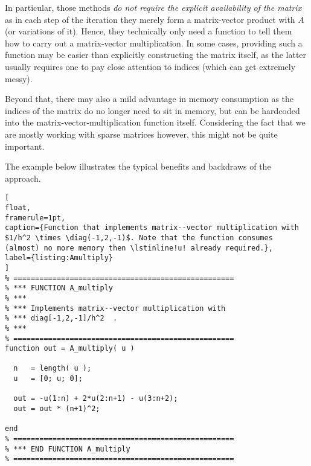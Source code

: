In particular, those methods \emph{do not require the explicit availability of the matrix} as in each step of the iteration they merely form a matrix-vector product with $A$ (or variations of it). Hence, they technically only need a function to tell them how to carry out a matrix-vector multiplication. In some cases, providing such a function may be easier than explicitly constructing the matrix itself, as the latter usually requires one to pay close attention to indices (which can get extremely messy).

Beyond that, there may also a mild advantage in memory consumption as the indices of the matrix do no longer need to sit in memory, but can be hardcoded into the matrix-vector-multiplication function itself. Considering the fact that we are mostly working with sparse matrices however, this might not be quite important.

The example below illustrates the typical benefits and backdraws of the approach.

\begin{lstlisting}[
float,
framerule=1pt,
caption={Function that implements matrix--vector multiplication with $1/h^2 \times \diag(-1,2,-1)$. Note that the function consumes (almost) no more memory then \lstinline!u! already required.},
label={listing:Amultiply}
]
% ===================================================
% *** FUNCTION A_multiply
% ***
% *** Implements matrix--vector multiplication with 
% *** diag[-1,2,-1]/h^2  .
% ***
% ===================================================
function out = A_multiply( u )

  n   = length( u );
  u   = [0; u; 0];

  out = -u(1:n) + 2*u(2:n+1) - u(3:n+2);
  out = out * (n+1)^2;

end 
% ===================================================
% *** END FUNCTION A_multiply
% ===================================================
\end{lstlisting}


